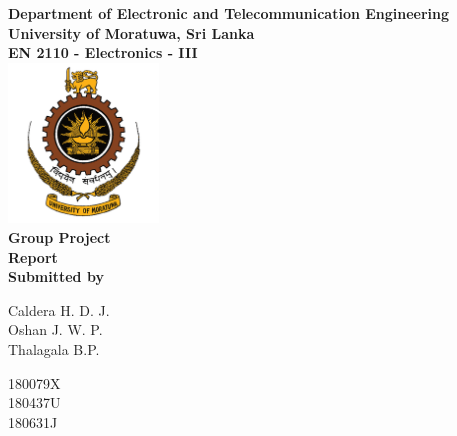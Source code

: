 \begin{titlepage}
\center %

\textbf{\large Department of Electronic and Telecommunication Engineering}\\[0.5cm]
\textbf{\Large University of Moratuwa, Sri Lanka}\\[1cm]
\textbf{\large EN 2110 - Electronics - III}\\[2cm]
\includegraphics[width=0.3\textwidth]{figures/uomlogo}\\[2cm]

	
\textbf{\Huge Group Project}\\[0.5cm]
\textbf{\Large Report}\\[5cm]



\textbf{\large Submitted by}\\[0.5cm]
\begin{minipage}{0.2\textwidth}
	\begin{flushleft}	   
		{\large Caldera H. D. J.}\\[4mm]
		{\large Oshan J. W. P.}\\[4mm]
		{\large Thalagala B.P.}\\[4mm]
		
	\end{flushleft}
\end{minipage}
\hspace{5mm}
\begin{minipage}{0.2\textwidth}
	\begin{flushright}
		{\large 180079X}\\[4mm]
		{\large 180437U}\\[4mm]
		{\large 180631J }\\[4mm]
		

\end{flushright}
\end{minipage}
\end{titlepage}
